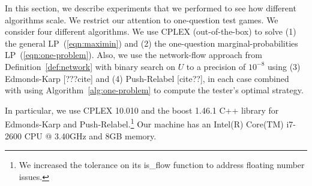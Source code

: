 \documentclass{article}
\begin{document}
In this section, we describe  experiments
that we performed 
 to see how different algorithms scale.
We restrict our attention to one-question test games.
We consider four different algorithms.  We use CPLEX (out-of-the-box)
to solve (1) the general LP~(\ref{eqn:maximin}) and (2) the one-question
marginal-probabilities LP~(\ref{eqn:one-problem}).  Also, we use the
network-flow approach from Definition~\ref{def:network} with binary search
on $U$ to a precision of $10^{-8}$ using (3) Edmonds-Karp [???cite] and (4)
Push-Relabel [cite??], in each case combined with using
Algorithm~\ref{alg:one-problem} to compute the tester's optimal strategy.

In particular, we use CPLEX 10.010 and the boost 1.46.1 C++ library
for Edmonds-Karp and Push-Relabel.\footnote{We increased the tolerance 
on its is\_flow function
to address floating number issues.} 
Our machine has an
Intel(R) Core(TM) i7-2600 CPU @ 3.40GHz and 8GB memory.

\end{document}
